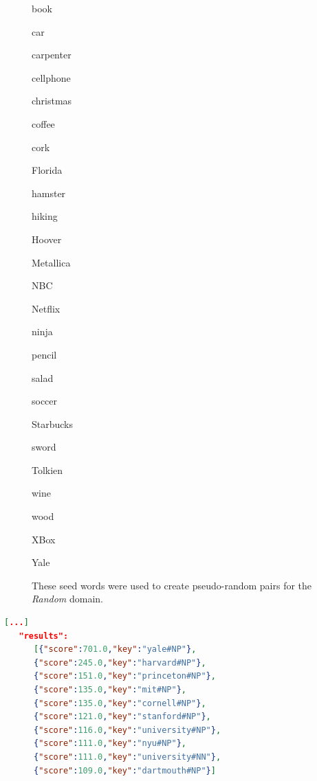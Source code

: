 \begin{figure}[bthp]
\centering
\caption{These seed words were used to create pseudo-random pairs for the \emph{Random} domain. }
\label{fig:seed}
\begin{multicols}{5}
book%

car%

carpenter%

cellphone%

christmas%

coffee%

cork%

Florida%

hamster%

hiking

Hoover%

Metallica%

NBC%

Netflix%

ninja%

pencil%

salad%

soccer%

Starbucks%

sword%

Tolkien%

wine%

wood%

XBox%

Yale%
\end{multicols}

\end{figure}

\begin{minipage}{\linewidth}
\begin{lstlisting}[language=json,label=lst:jbtres,caption=The JoBimText response for \emph{\enquote{Yale}}. These objects can be compared in a meaningful way.]
[...]
   "results":
      [{"score":701.0,"key":"yale#NP"},
      {"score":245.0,"key":"harvard#NP"},
      {"score":151.0,"key":"princeton#NP"},
      {"score":135.0,"key":"mit#NP"},
      {"score":135.0,"key":"cornell#NP"},
      {"score":121.0,"key":"stanford#NP"},
      {"score":116.0,"key":"university#NP"},
      {"score":111.0,"key":"nyu#NP"},
      {"score":111.0,"key":"university#NN"},
      {"score":109.0,"key":"dartmouth#NP"}]
\end{lstlisting}
\end{minipage}

